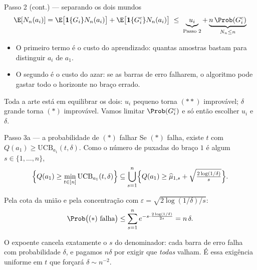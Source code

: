 \documentclass[aspectratio=169, 11pt]{beamer}
\newcommand{\muh}{\widehat{\mu}}
\newcommand{\Ind}{\mathbf{1}}
\newcommand{\ucb}{\mathrm{UCB}}
\begin{document}
\begin{frame}{Passo 2 (cont.) --- separando os dois mundos}
  \[
    \E[N_n(a_i)]
      = \E\bigl[\Ind\{G_i\}N_n(a_i)\bigr] + \E\bigl[\Ind\{G_i^{c}\}N_n(a_i)\bigr]
      \;\le\; \underbrace{u_i}_{\text{Passo 2}} + \underbrace{n\,\Prob(G_i^{c})}_{N_n\le n}
  \]

  \begin{itemize}\small
    \item O primeiro termo é o \alert{custo do aprendizado}: quantas amostras
          bastam para distinguir $a_i$ de $a_1$.
    \item O segundo é o \alert{custo do azar}: se as barras de erro falharem, o
          algoritmo pode gastar todo o horizonte no braço errado.
  \end{itemize}

  \begin{alertabox}
    Toda a arte está em equilibrar os dois: $u_i$ pequeno torna $(**)$
    improvável; $\delta$ grande torna $(*)$ improvável. Vamos limitar
    $\Prob(G_i^{c})$ e só então escolher $u_i$ e $\delta$.
  \end{alertabox}
\end{frame}

\begin{frame}{Passo 3a --- a probabilidade de $(*)$ falhar}
  Se $(*)$ falha, existe $t$ com $Q(a_1)\ge \ucb_{a_1}(t,\delta)$. Como o número
  de puxadas do braço $1$ é algum $s\in\{1,\dots,n\}$,
  \vspace{-0.3em}
  \[
    \Bigl\{Q(a_1)\ge \min_{t\in[n]}\ucb_{a_1}(t,\delta)\Bigr\}
    \subseteq \bigcup_{s=1}^{n}
      \Bigl\{Q(a_1)\ge \muh_{1,s}+\sqrt{\tfrac{2\log(1/\delta)}{s}}\Bigr\}.
  \]
  \vspace{-0.7em}

  Pela cota da união e pela concentração com
  $\varepsilon=\sqrt{2\log(1/\delta)/s}$:
  \vspace{-0.3em}
  \[
    \Prob\bigl((*)\text{ falha}\bigr)
      \le \sum_{s=1}^{n} e^{-s\cdot\frac{2\log(1/\delta)}{2s}} = n\,\delta .
  \]

  \begin{ideiabox}
    O expoente cancela exatamente o $s$ do denominador: cada barra de erro
    falha com probabilidade $\delta$, e pagamos $n\delta$ por exigir que
    \emph{todas} valham. É essa exigência uniforme em $t$ que forçará
    $\delta \sim n^{-2}$.
  \end{ideiabox}
\end{frame}
\end{document}

